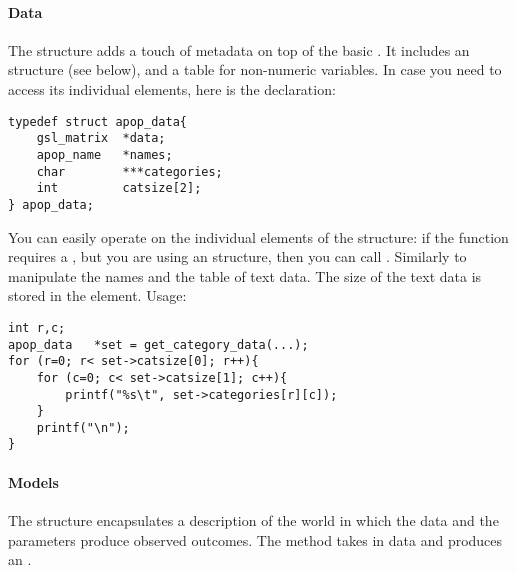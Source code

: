 \paragraph{Data}
The  structure adds a touch of metadata on top of the
basic . It includes an  structure (see
below), and a table for non-numeric variables. In case you need to access
its individual elements, here is the declaration:

\begin{lstlisting}
typedef struct apop_data{
    gsl_matrix  *data;
    apop_name   *names;
    char        ***categories;
    int         catsize[2];
} apop_data;
\end{lstlisting}
You can easily operate on the individual elements of the structure:
if the  function requires a
, but you are using an 
structure, then you can call
. Similarly to
manipulate the names and the table of text data. The size of the text
data is stored in the  element. Usage:

\begin{lstlisting}
int r,c;
apop_data   *set = get_category_data(...);
for (r=0; r< set->catsize[0]; r++){
    for (c=0; c< set->catsize[1]; c++){
        printf("%s\t", set->categories[r][c]);
    }
    printf("\n");
}
\end{lstlisting}


\paragraph{Models}
The  structure encapsulates a description of the world
in which the data and the parameters produce observed outcomes. The
 method takes in data and produces an . 


